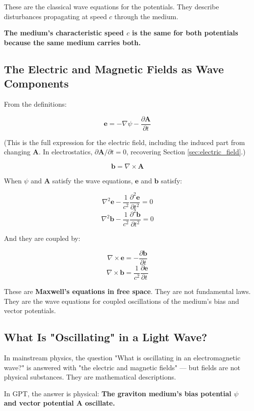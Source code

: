 \documentclass[12pt, a4paper]{article}
\begin{document}
These are the classical wave equations for the potentials. They describe disturbances propagating at speed \( c \) through the medium.

\textbf{The medium's characteristic speed \( c \) is the same for both potentials because the same medium carries both.}

\subsection{The Electric and Magnetic Fields as Wave Components}
\label{subsec:fields_as_waves}

From the definitions:

\[
\mathbf{e} = -\nabla \psi - \frac{\partial \mathbf{A}}{\partial t}
\]

(This is the full expression for the electric field, including the induced part from changing \( \mathbf{A} \). In electrostatics, \( \partial \mathbf{A}/\partial t = 0 \), recovering Section \ref{sec:electric_field}.)

\[
\mathbf{b} = \nabla \times \mathbf{A}
\]

When \( \psi \) and \( \mathbf{A} \) satisfy the wave equations, \( \mathbf{e} \) and \( \mathbf{b} \) satisfy:

\[
\nabla^2 \mathbf{e} - \frac{1}{c^2} \frac{\partial^2 \mathbf{e}}{\partial t^2} = 0
\]
\[
\nabla^2 \mathbf{b} - \frac{1}{c^2} \frac{\partial^2 \mathbf{b}}{\partial t^2} = 0
\]

And they are coupled by:

\[
\nabla \times \mathbf{e} = -\frac{\partial \mathbf{b}}{\partial t}
\]
\[
\nabla \times \mathbf{b} = \frac{1}{c^2} \frac{\partial \mathbf{e}}{\partial t}
\]

These are \textbf{Maxwell's equations in free space}. They are not fundamental laws. They are the wave equations for coupled oscillations of the medium's bias and vector potentials.

\subsection{What Is "Oscillating" in a Light Wave?}
\label{subsec:what_oscillates}

In mainstream physics, the question "What is oscillating in an electromagnetic wave?" is answered with "the electric and magnetic fields" — but fields are not physical substances. They are mathematical descriptions.

In GPT, the answer is physical: \textbf{The graviton medium's bias potential \( \psi \) and vector potential \( \mathbf{A} \) oscillate.}
\end{document}
